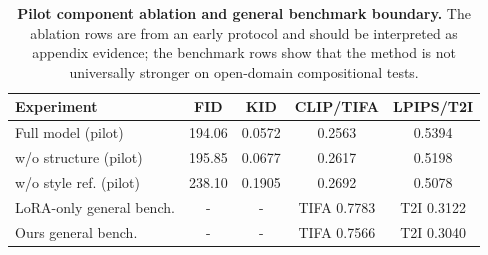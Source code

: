 \begin{table}[t]
\centering
\small
\caption{\textbf{Pilot component ablation and general benchmark boundary.} The ablation rows are from an early protocol and should be interpreted as appendix evidence; the benchmark rows show that the method is not universally stronger on open-domain compositional tests.}
\label{tab:pilot-ablation-general-benchmark}
\begin{tabular}{lcccc}
\toprule
\textbf{Experiment} & \textbf{FID} & \textbf{KID} & \textbf{CLIP/TIFA} & \textbf{LPIPS/T2I} \\
\midrule
Full model (pilot) & 194.06 & 0.0572 & 0.2563 & 0.5394 \\
w/o structure (pilot) & 195.85 & 0.0677 & 0.2617 & 0.5198 \\
w/o style ref. (pilot) & 238.10 & 0.1905 & 0.2692 & 0.5078 \\
LoRA-only general bench. & - & - & TIFA 0.7783 & T2I 0.3122 \\
Ours general bench. & - & - & TIFA 0.7566 & T2I 0.3040 \\
\bottomrule
\end{tabular}
\end{table}
